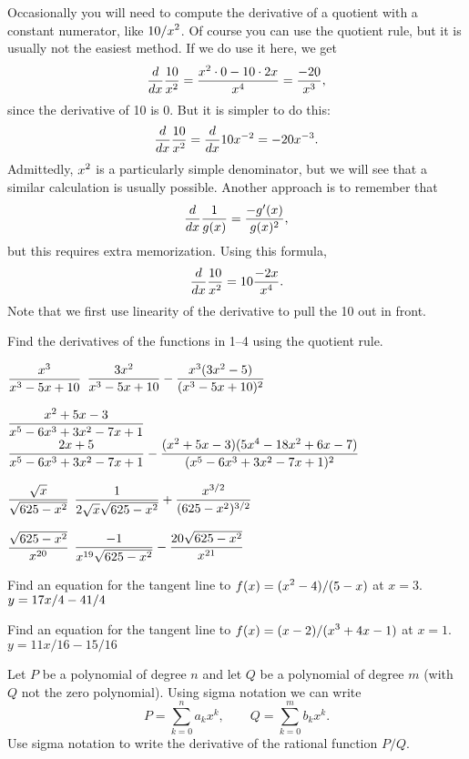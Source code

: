 \endexample

Occasionally you will need to compute the derivative of a quotient
with a constant numerator, like $\displaystyle 10/x^2$. Of course you can use the
quotient rule, but it is usually not the easiest method. If we do use
it here, we get 
$${d\over dx}{10\over x^2}={x^2\cdot 0-10\cdot 2x\over x^4}=
{-20\over x^3},$$
since the derivative of 10 is 0. But it is simpler to do this:
$${d\over dx}{10\over x^2}={d\over dx}10x^{-2}=-20x^{-3}.$$
Admittedly, $\displaystyle x^2$ is a particularly simple denominator, but we will
see that a similar calculation is usually possible. Another approach
is to remember that
$${d\over dx}{1\over g(x)}={-g'(x)\over g(x)^2},$$
but this requires extra memorization. Using this formula,
$${d\over dx}{10\over x^2}=10{-2x\over x^4}.$$
Note that we first use linearity of the derivative to pull the 10 out
in front.


\exercises

Find the derivatives of the functions in 1--4
using the quotient rule.

\twocol

\exercise $\displaystyle {x^3\over x^3-5x+10}$
\answer $\displaystyle {3x^2\over x^3-5x+10}-{x^3(3x^2-5)\over (x^3-5x+10)^2}$
\endanswer
\endexercise

\exercise $\displaystyle {x^2+5x-3\over x^5-6x^3+3x^2-7x+1}$
\answer $\displaystyle {2x+5\over x^5-6x^3+3x^2-7x+1}-
{(x^2+5x-3)(5x^4-18x^2+6x-7)\over(x^5-6x^3+3x^2-7x+1)^2}$
\endanswer

\ssk
\endexercise

\exercise $\displaystyle {\sqrt{x}\over\sqrt{625-x^2}}$
\answer $\displaystyle {1\over 2\sqrt{x}\sqrt{625-x^2}}+{x^{3/2}\over(625-x^2)^{3/2}}$
\endanswer
\endexercise

\exercise $\displaystyle {\sqrt{625-x^2}\over x^{20}}$
\answer $\displaystyle {-1\over x^{19}\sqrt{625-x^2}}-{20\sqrt{625-x^2}\over x^{21}}$
\endanswer

\endtwocol
\bsk
\endexercise

\exercise Find an equation for the tangent line to $\displaystyle f(x) = (x^2 -
4)/(5-x)$ at $x= 3$.  
\answer $\displaystyle y=17x/4-41/4$ 
\endanswer
\endexercise

\exercise  Find an equation for the tangent line to 
$\displaystyle f(x) = (x-2)/(x^3 + 4x - 1)$ at $x=1$.
\answer $y=11x/16-15/16$
\endanswer
\endexercise

\exercise Let $P$ be a polynomial of degree $n$ and let $Q$ be a
polynomial of degree $m$ (with $Q$ not the zero polynomial). 
Using sigma notation we can write
$$P=\sum _{k=0 } ^n a_k x^k,\qquad
Q=\sum_{k=0}^m b_k x^k.
$$
Use sigma notation to write the derivative of the 
{\dfont rational function\/}
$P/Q$.
\endexercise

